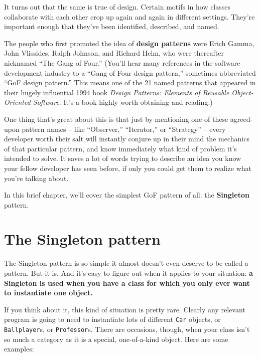 It turns out that the same is true of design. Certain motifs in how classes
collaborate with each other crop up again and again in different settings.
They're important enough that they've been identified, described, and named.

The people who first promoted the idea of \textbf{design patterns} were Erich
Gamma, John Vlissides, Ralph Johnson, and Richard Helm, who were thereafter
nicknamed ``The Gang of Four.'' (You'll hear many references in the software
development industry to a ``Gang of Four design pattern,'' sometimes
abbreviated ``GoF design pattern.'' This means one of the 21 named patterns
that appeared in their hugely influential 1994 book \textit{Design Patterns:
Elements of Reusable Object-Oriented Software}. It's a book highly worth
obtaining and reading.)

One thing that's great about this is that just by mentioning one of these
agreed-upon pattern names -- like ``Observer,'' ``Iterator,'' or ``Strategy'' --
every developer worth their salt will instantly conjure up in their mind the
mechanics of that particular pattern, and know immediately what kind of
problem it's intended to solve. It saves a lot of words trying to describe an
idea you know your fellow developer has seen before, if only you could get
them to realize what you're talking about.

In this brief chapter, we'll cover the simplest GoF pattern of all:
the \textbf{Singleton} pattern.

\section{The Singleton pattern}

The Singleton pattern is so simple it almost doesn't even deserve to be called
a pattern. But it is. And it's easy to figure out when it applies to your
situation: \textbf{a Singleton is used when you have a class for which you
only ever want to instantiate one object.}

If you think about it, this kind of situation is pretty rare. Clearly any
relevant program is going to need to instantiate lots of different
\texttt{Car} objects, or \texttt{Ballplayer}s, or \texttt{Professor}s. There
are occasions, though, when your class isn't so much a category as it is a
special, one-of-a-kind object. Here are some examples:

